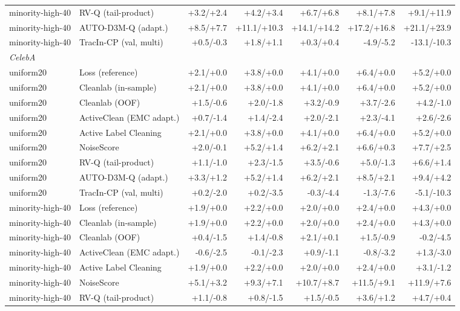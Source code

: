 \documentclass{article}
\begin{document}
\begin{table}[H]
{\begin{tabular}{llrrrrr}
minority-high-40 & RV-Q (tail-product) & +3.2/+2.4 & +4.2/+3.4 & +6.7/+6.8 & +8.1/+7.8 & +9.1/+11.9 \\
minority-high-40 & AUTO-D3M-Q (adapt.) & +8.5/+7.7 & +11.1/+10.3 & +14.1/+14.2 & +17.2/+16.8 & +21.1/+23.9 \\
minority-high-40 & TracIn-CP (val, multi) & +0.5/-0.3 & +1.8/+1.1 & +0.3/+0.4 & -4.9/-5.2 & -13.1/-10.3 \\
\midrule
\multicolumn{6}{l}{\emph{CelebA}} \\
uniform20 & Loss (reference) & +2.1/+0.0 & +3.8/+0.0 & +4.1/+0.0 & +6.4/+0.0 & +5.2/+0.0 \\
uniform20 & Cleanlab (in-sample) & +2.1/+0.0 & +3.8/+0.0 & +4.1/+0.0 & +6.4/+0.0 & +5.2/+0.0 \\
uniform20 & Cleanlab (OOF) & +1.5/-0.6 & +2.0/-1.8 & +3.2/-0.9 & +3.7/-2.6 & +4.2/-1.0 \\
uniform20 & ActiveClean (EMC adapt.) & +0.7/-1.4 & +1.4/-2.4 & +2.0/-2.1 & +2.3/-4.1 & +2.6/-2.6 \\
uniform20 & Active Label Cleaning & +2.1/+0.0 & +3.8/+0.0 & +4.1/+0.0 & +6.4/+0.0 & +5.2/+0.0 \\
uniform20 & NoiseScore & +2.0/-0.1 & +5.2/+1.4 & +6.2/+2.1 & +6.6/+0.3 & +7.7/+2.5 \\
uniform20 & RV-Q (tail-product) & +1.1/-1.0 & +2.3/-1.5 & +3.5/-0.6 & +5.0/-1.3 & +6.6/+1.4 \\
uniform20 & AUTO-D3M-Q (adapt.) & +3.3/+1.2 & +5.2/+1.4 & +6.2/+2.1 & +8.5/+2.1 & +9.4/+4.2 \\
uniform20 & TracIn-CP (val, multi) & +0.2/-2.0 & +0.2/-3.5 & -0.3/-4.4 & -1.3/-7.6 & -5.1/-10.3 \\
minority-high-40 & Loss (reference) & +1.9/+0.0 & +2.2/+0.0 & +2.0/+0.0 & +2.4/+0.0 & +4.3/+0.0 \\
minority-high-40 & Cleanlab (in-sample) & +1.9/+0.0 & +2.2/+0.0 & +2.0/+0.0 & +2.4/+0.0 & +4.3/+0.0 \\
minority-high-40 & Cleanlab (OOF) & +0.4/-1.5 & +1.4/-0.8 & +2.1/+0.1 & +1.5/-0.9 & -0.2/-4.5 \\
minority-high-40 & ActiveClean (EMC adapt.) & -0.6/-2.5 & -0.1/-2.3 & +0.9/-1.1 & -0.8/-3.2 & +1.3/-3.0 \\
minority-high-40 & Active Label Cleaning & +1.9/+0.0 & +2.2/+0.0 & +2.0/+0.0 & +2.4/+0.0 & +3.1/-1.2 \\
minority-high-40 & NoiseScore & +5.1/+3.2 & +9.3/+7.1 & +10.7/+8.7 & +11.5/+9.1 & +11.9/+7.6 \\
minority-high-40 & RV-Q (tail-product) & +1.1/-0.8 & +0.8/-1.5 & +1.5/-0.5 & +3.6/+1.2 & +4.7/+0.4 \\

\end{tabular}}
\end{table}
\end{document}
